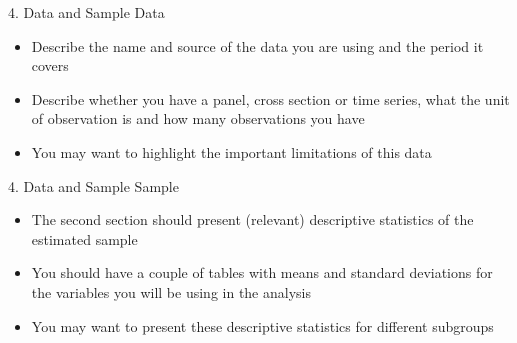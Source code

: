 \documentclass[dvipsnames,hyperref={pdfpagelabels=false}]{beamer}
\begin{document}
\begin{frame}{4. Data and Sample }{Data}
	\begin{itemize} 
		
		\item Describe the name and source of the data you are using and the period it covers
		\vspace{0.2cm}
		\item Describe whether you have a panel, cross section or
		time series, what the unit of observation is and how many observations you have
		\vspace{0.2cm}
		\item You may want to highlight the important limitations of this data
		
		
		
	\end{itemize}
	
	
	
\end{frame}



\begin{frame}{4. Data and Sample }{Sample}
	\begin{itemize} 
		
		\item The second section should present (relevant) descriptive statistics of the estimated sample
		\vspace{0.2cm}
		\item You should have a couple of tables with means and standard deviations for the variables you will be using in the analysis
		\vspace{0.2cm}
		\item You may want to present these descriptive statistics
		for different subgroups
		
	\end{itemize}
	
	
	
\end{frame}
\end{document}
